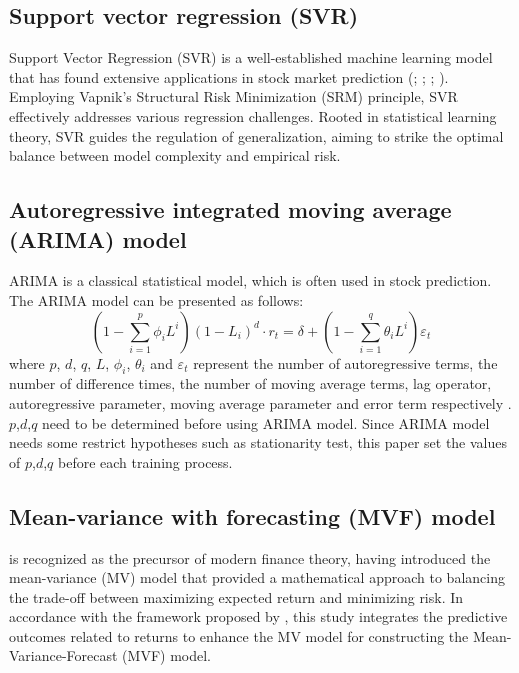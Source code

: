 
\subsection{Support vector regression (SVR)}

Support Vector Regression (SVR) is a well-established machine learning model that has found extensive applications in stock market prediction (\cite{Emir2013}; \cite{Lu2009}; \cite{Matias2012}; \cite{Rasel2015}). Employing Vapnik's Structural Risk Minimization (SRM) principle, SVR effectively addresses various regression challenges. Rooted in statistical learning theory, SVR guides the regulation of generalization, aiming to strike the optimal balance between model complexity and empirical risk.


\subsection{Autoregressive integrated moving average (ARIMA) model}

ARIMA is a classical statistical model, which is often used in stock prediction. The ARIMA model can be presented as follows:
\[(1 - \sum_{i=1}^{p} \phi_i{L^{i}})(1 - L_i)^d \cdot r_t = \delta + (1 - \sum_{i=1}^{q} \theta_i{L^i}) \varepsilon_t\]
where $p$, $d$, $q$, $L$, $\phi_i$, $\theta_i$ and $\varepsilon_t$ represent the number of autoregressive terms, the number of difference times, the number of moving average terms, lag operator, autoregressive parameter, moving average parameter and error term respectively \cite{Yu2020}. $p$,$d$,$q$ need to be determined before using ARIMA model. Since ARIMA model needs some restrict hypotheses such as stationarity test, this paper set the values of $p$,$d$,$q$ before each training process.

\subsection{Mean-variance with forecasting (MVF) model}
\cite{Markowitz1952} is recognized as the precursor of modern finance theory, having introduced the mean-variance (MV) model that provided a mathematical approach to balancing the trade-off between maximizing expected return and minimizing risk. In accordance with the framework proposed by \cite{Yu2020}, this study integrates the predictive outcomes related to returns to enhance the MV model for constructing the Mean-Variance-Forecast (MVF) model.

